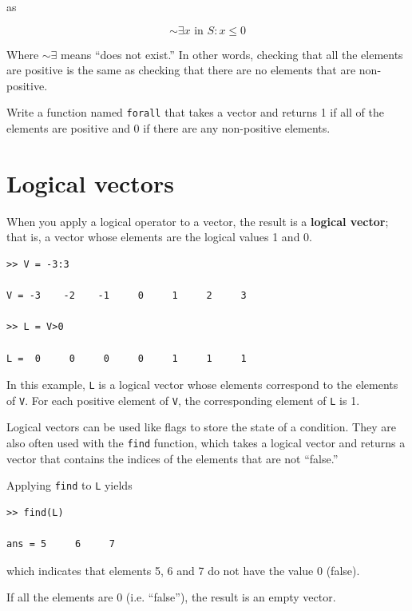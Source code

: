 \documentclass[
]{book}
\begin{document}
as

\begin{equation}
\sim \exists x \mbox{~in~} S: x \le 0
\end{equation}

Where $\sim \exists$ means ``does not exist.''
In other words, checking that all the elements are positive is
the same as checking that there are no elements
that are non-positive.

\begin{ex}
Write a function named {\tt forall} that
takes a vector and returns 1 if all of the elements are positive
and 0 if there are any non-positive elements.
\end{ex}




\section{Logical vectors}

When you apply a logical operator to a vector, the result is a {\bf
logical vector}; that is, a vector whose elements are the logical
values 1 and 0.

\begin{verbatim}
>> V = -3:3

V = -3    -2    -1     0     1     2     3

>> L = V>0

L =  0     0     0     0     1     1     1
\end{verbatim}

In this example, {\tt L} is a logical vector whose elements
correspond to the elements of {\tt V}.  For each positive element of
{\tt V}, the corresponding element of {\tt L} is 1.

Logical vectors can be used like flags to store the state of
a condition.  They are also often used with the {\tt find} function,
which takes a logical vector and returns a vector that contains
the indices of the elements that are not ``false.''

Applying {\tt find} to {\tt L} yields

\begin{verbatim}
>> find(L)

ans = 5     6     7
\end{verbatim}

which indicates that elements 5, 6 and 7 do not have the value 0 (false).

If all the elements are 0 (i.e. ``false''), the result is an empty vector.
\end{document}
